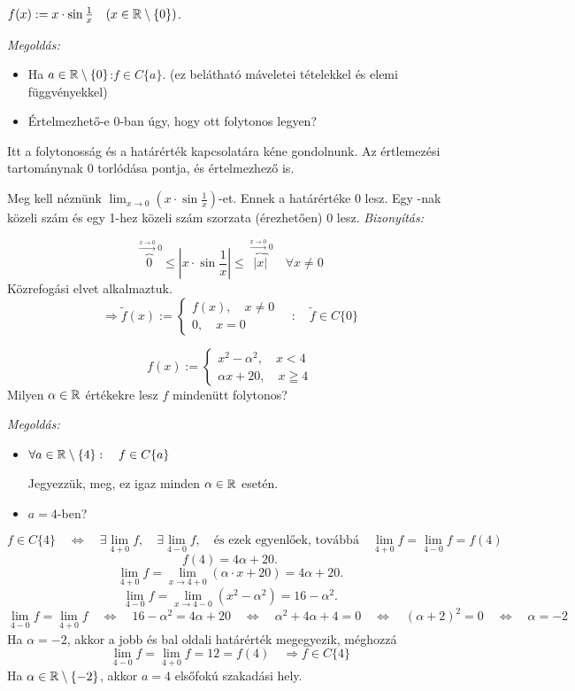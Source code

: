 \documentclass[a4paper,11.5pt]{article}
\begin{document}
	\begin{task}
		$f(x):=x\cdot\sin\frac{1}{x}\quad (x\in\mathbb{R}\setminus\{0\})$.
		\medskip
		
		\textit{Megoldás:} 
		\begin{itemize}
			\item Ha $a\in\mathbb{R}\setminus\{0\}$:\quad $f\in C\{a\}.$ (ez belátható máveletei tételekkel és elemi függvényekkel)
			\item Értelmezhető-e 0-ban úgy, hogy ott folytonos legyen?
		\end{itemize}
		Itt a folytonosság és a határérték kapcsolatára kéne gondolnunk. Az értlemezési tartománynak 0 torlódása pontja, és értelmezhező is.
		
		Meg kell néznünk $\lim_{x\to0}(x\cdot\sin\frac{1}{x})$-et. Ennek a határértéke 0 lesz. Egy -nak közeli szám és egy 1-hez közeli szám szorzata (érezhetően) 0 lesz. 
		\textit{Bizonyítás:}
		
		\[ \overbrace{0}^{\overset{x\to0}{\longrightarrow}0}\leq\left|x\cdot\sin\frac{1}{x}\right|\leq \overbrace{|x|}^{\overset{x\to0}{\longrightarrow} 0}\quad \forall x\not=0 \]
		Közrefogási elvet alkalmaztuk.
		\[ \Rightarrow \tilde{f}(x):=\begin{cases}
		f(x),\quad x\not=0\\
		0,\quad x=0
		\end{cases}\quad :\quad \tilde{f}\in C\{0\} \]
	\end{task}
	\begin{task}
		\[f(x):=\begin{cases}
		x^2-\alpha^2,\quad x<4\\
		\alpha x+20,\quad x\geqq 4
		\end{cases}\]
		Milyen $\alpha\in\mathbb{R}$ értékekre lesz $f$ mindenütt folytonos?
		
		\textit{Megoldás:}
		\begin{itemize}
			\item 
			$\forall a\in\mathbb{R}\setminus\{4\}:\quad f\in C\{a\}$
			
			Jegyezzük, meg, ez igaz minden $\alpha\in\mathbb{R}$ esetén.
			\item $a=4$-ben?
		\end{itemize}
		\[f\in C\{4\}\quad \Leftrightarrow\quad \exists\lim_{4+0} f,\quad \exists\lim_{4-0}f,\quad \text{és ezek egyenlőek, továbbá} \quad \lim_{4+0} f= \lim_{4-0}f=f(4)\]
		\[ f(4)=4\alpha+20. \]
		\[ \lim_{4+0}f=\lim_{x\to4+0}(\alpha\cdot x+20)=4\alpha+20. \]
		\[ \lim_{4-0}f=\lim_{x\to4-0}(x^2-\alpha^2)=16-\alpha^2. \]
		\[ \lim_{4-0}f=\lim_{4+0}f\quad \Leftrightarrow \quad 16-\alpha^2=4\alpha+20\quad \Leftrightarrow\quad  \alpha^2+4\alpha+4=0\quad \Leftrightarrow\quad (\alpha+2)^2=0\quad \Leftrightarrow\quad \alpha = -2 \]
		Ha $\alpha=-2$, akkor a jobb és bal oldali határérték megegyezik, méghozzá
		\[ \lim_{4-0}f=\lim_{4+0}f=12=f(4)\quad \Rightarrow f\in C\{4\} \]
		Ha $\alpha\in\mathbb{R}\setminus\{-2\}$, akkor $a=4$ elsőfokú szakadási hely.
		
	\end{task}
\end{document}
